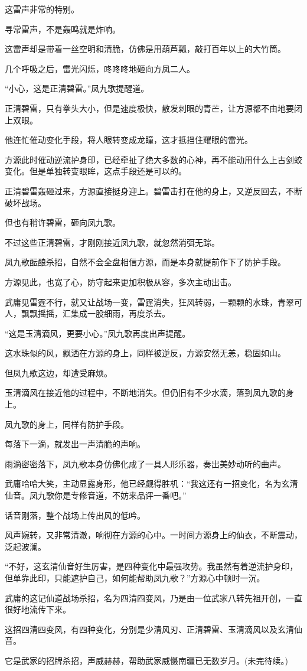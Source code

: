 \begin{this_body}
这雷声非常的特别。

寻常雷声，不是轰鸣就是炸响。

这雷声却是带着一丝空明和清脆，仿佛是用葫芦瓢，敲打百年以上的大竹筒。

几个呼吸之后，雷光闪烁，咚咚咚地砸向方凤二人。

“小心，这是正清碧雷。”凤九歌提醒道。

正清碧雷，只有拳头大小，但是速度极快，散发刺眼的青芒，让方源都不由地要闭上双眼。

他连忙催动变化手段，将人眼转变成龙瞳，这才抵挡住耀眼的雷光。

方源此时催动逆流护身印，已经牵扯了绝大多数的心神，再不能动用什么上古剑蛟变化。但是单独转变眼眸，这点手段还是可以的。

正清碧雷轰砸过来，方源直接挺身迎上。碧雷击打在他的身上，又逆反回去，不断破坏战场。

但也有稍许碧雷，砸向凤九歌。

不过这些正清碧雷，才刚刚接近凤九歌，就忽然消弭无踪。

凤九歌酝酿杀招，自然不会全盘相信方源，而是本身就提前作下了防护手段。

方源见此，也宽了心，防守起来更加积极从容，多次主动出击。

武庸见雷霆不行，就又让战场一变，雷霆消失，狂风转弱，一颗颗的水珠，青翠可人，飘飘摇摇，汇集成一股细雨，再度杀去。

“这是玉清滴风，更要小心。”凤九歌再度出声提醒。

这水珠似的风，飘洒在方源的身上，同样被逆反，方源安然无恙，稳固如山。

但凤九歌这边，却遭受麻烦。

玉清滴风在接近他的过程中，不断地消失。但仍旧有不少水滴，落到凤九歌的身上。

凤九歌的身上，同样有防护手段。

每落下一滴，就发出一声清脆的声响。

雨滴密密落下，凤九歌本身仿佛化成了一具人形乐器，奏出美妙动听的曲声。

武庸哈哈大笑，主动显露身形，他已经觑得胜机：“我这还有一招变化，名为玄清仙音。凤九歌你是专修音道，不妨来品评一番吧。”

话音刚落，整个战场上传出风的低吟。

风声婉转，又非常清澈，响彻在方源的心中。一时间方源身上的仙衣，不断震动，泛起波澜。

“不好，这玄清仙音好生厉害，是四种变化中最强攻势。我虽然有着逆流护身印，但单靠此印，只能遮护自己，如何能帮助凤九歌？”方源心中顿时一沉。

武庸的这记仙道战场杀招，名为四清四变风，乃是由一位武家八转先祖开创，一直很好地流传下来。

这招四清四变风，有四种变化，分别是少清风刃、正清碧雷、玉清滴风以及玄清仙音。

它是武家的招牌杀招，声威赫赫，帮助武家威慑南疆已无数岁月。(未完待续。)

\end{this_body}


